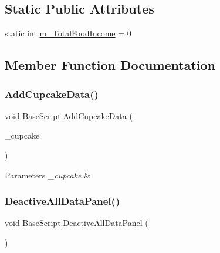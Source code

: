 \subsection*{Static Public Attributes}
\begin{DoxyCompactItemize}
\item 
static int \mbox{\hyperlink{class_base_script_a68c475358c96c7388c6b9c6cacd38d80}{m\+\_\+\+Total\+Food\+Income}} = 0
\end{DoxyCompactItemize}


\subsection{Member Function Documentation}
\mbox{\label{class_base_script_a626637a12b116f38e80d0e65c36986b5}} 
\subsubsection{\texorpdfstring{AddCupcakeData()}{AddCupcakeData()}}
{\footnotesize\ttfamily void Base\+Script.\+Add\+Cupcake\+Data (\begin{DoxyParamCaption}\item[{\mbox{\hyperlink{class_cupcake_data_script}{Cupcake\+Data\+Script}}}]{\+\_\+cupcake }\end{DoxyParamCaption})}






\begin{DoxyParams}{Parameters}
{\em \+\_\+cupcake} & \\
\hline
\end{DoxyParams}
\mbox{\label{class_base_script_a22828ab8a06241acaf8f805357ff6ba6}} 
\subsubsection{\texorpdfstring{DeactiveAllDataPanel()}{DeactiveAllDataPanel()}}
{\footnotesize\ttfamily void Base\+Script.\+Deactive\+All\+Data\+Panel (\begin{DoxyParamCaption}{ }\end{DoxyParamCaption})}





